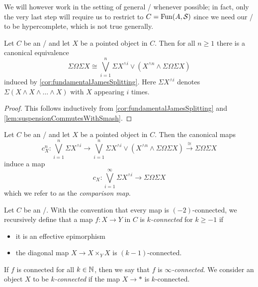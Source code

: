 We will however work in the setting of general \inftytops/ whenever possible; 
in fact, only the very last step will require us to restrict to $C=\operatorname{Fun}(A,\mathcal{S})$ since we need our \inftytop/ to be hypercomplete, which is not true generally.
\begin{corollary}
    Let $C$ be an \inftytop/ and let $X$ be a pointed object in $C$. 
    Then for all $n\geq 1$ there is a canonical equivalence
    \begin{equation*}
        \Sigma\Omega\Sigma X \cong\bigvee\limits_{i=1}^n\Sigma X^{\wedge i}\vee\left(X^{\wedge n}\wedge\Sigma\Omega\Sigma X\right)
    \end{equation*}
    induced by \cref{cor:fundamentalJamesSplitting}.
    Here $\Sigma X^{\wedge i}$ denotes $\Sigma\left(X\wedge X\wedge\ldots\wedge X\right)$ with $X$ appearing $i$ times.
    \begin{proof}
        This follows inductively from \cref{cor:fundamentalJamesSplitting} and \cref{lem:suspensionCommutesWithSmash}.
    \end{proof}
\end{corollary}
\begin{definition}
    Let $C$ be an \inftytop/ and let $X$ be a pointed object in $C$. 
    Then the canonical maps 
    \begin{equation*}
        c_X^n\colon\bigvee\limits_{i=1}^n\Sigma X^{\wedge i}\to\bigvee\limits_{i=1}^n\Sigma X^{\wedge i}\vee\left(X^{\wedge n}\wedge\Sigma\Omega\Sigma X\right)\xrightarrow{\cong}\Sigma\Omega\Sigma X
    \end{equation*}
    induce a map
    \begin{equation*}
        c_X\colon\bigvee\limits_{i=1}^{\infty}\Sigma X^{\wedge i}\to\Sigma\Omega\Sigma X
    \end{equation*}
    which we refer to as the \emph{comparison map}.
\end{definition}
\begin{definition}\label{def:connected}
    Let $C$ be an \inftytop/.
    With the convention that every map is $(-2)$-connected, we recursively define that a map $f\colon X\to Y$ in $C$ is \emph{$k$-connected} for $k\geq -1$ if
    \begin{itemize}
        \item it is an effective epimorphism
        \item the diagonal map $X\to X\times_YX$ is $(k-1)$-connected.
    \end{itemize} 
    If $f$ is connected for all $k\in\mathbb{N}$, then we say that $f$ is \emph{$\infty$-connected}.
    We consider an object $X$ to be \emph{$k$-connected} if the map $X\to *$ is $k$-connected.
\end{definition}
